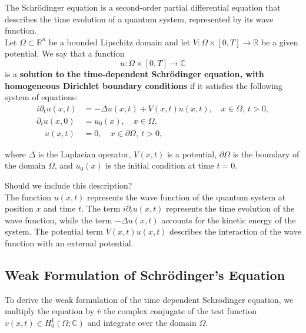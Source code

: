 \documentclass{article}
\theoremstyle{definition}
\theoremstyle{plain}
\theoremstyle{remark}
\begin{document}
The Schrödinger equation is a second-order partial differential equation that describes the time evolution of a quantum system, represented by its wave function. \\
Let $\Omega \subset \mathbb{R}^n$ be a bounded Lipschitz domain and let $V : \Omega \times [0,T] \to \mathbb{R}$ be a given potential. We say that a function
\[
u : \Omega \times [0,T] \to \mathbb{C}
\]
is a \textbf{solution to the time-dependent Schrödinger equation, with homogeneous Dirichlet boundary conditions} if it satisfies the following system of equations:
\begin{align*}
    i \partial_t u(x,t) &= - \Delta u(x,t) + V(x,t) u(x,t), \quad x \in \Omega, \ t > 0,\\
    \partial_t u(x,0) &= u_0(x), \quad x \in \Omega,\\
    \quad u(x,t) &= 0, \quad x \in \partial \Omega, \ t > 0,
\end{align*}


where $\Delta$ is the Laplacian operator, $V(x,t)$ is a potential, $\partial \Omega$ is the boundary of the domain $\Omega$, and $u_0(x)$ is the initial condition at time $t=0$. 


Should we include this description?\\
The function $u(x,t)$ represents the wave function of the quantum system at position $x$ and time $t$. The term $i \partial_t u(x,t)$ represents the time evolution of the wave function, while the term $-\Delta u(x,t)$ accounts for the kinetic energy of the system. The potential term $V(x,t) u(x,t)$ describes the interaction of the wave function with an external potential.


\subsection*{Weak Formulation of Schrödinger's Equation}
To derive the weak formulation of the time dependent Schrödinger equation, we multiply the equation by $\bar{v}$ the complex conjugate of the test function $v(x,t) \in H_0^1(\Omega; \mathbb{C})$ and integrate over the domain $\Omega$. 
\end{document}
